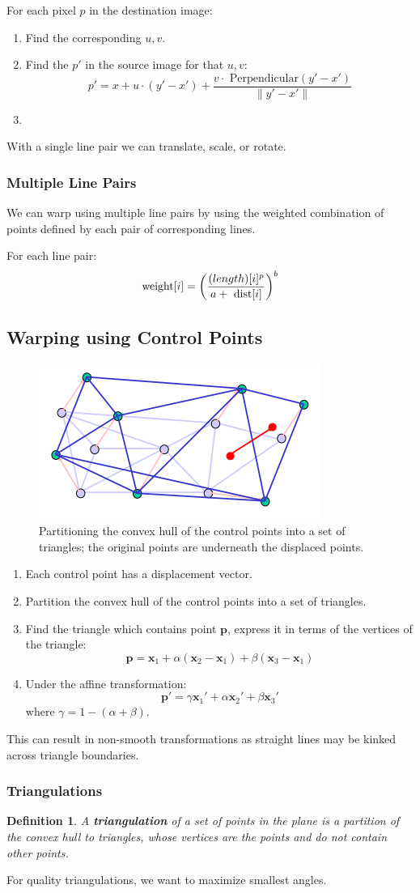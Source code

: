 \documentclass[11pt]{article}
\newtheorem{defn}{Definition}
\begin{document}
For each pixel $p$ in the destination image:
\begin{enumerate}
  \item Find the corresponding $u, v$.
  \item Find the $p'$ in the source image for that $u, v$:
    \[
      p' = x + u \cdot (y' - x') + \frac{v \cdot \text{ Perpendicular}(y'-x')}{\lVert y'-x' \rVert} 
    \]
  \item 
\end{enumerate}

With a single line pair we can translate, scale, or rotate.

\subsubsection{Multiple Line Pairs}
We can warp using multiple line pairs by using the weighted combination of points defined by each pair of corresponding lines.

For each line pair:
\[
  \text{weight}[i] = \left( \frac{\text(length)[i]^p}{a + \text{ dist}[i]} \right)^b 
\]

\subsection{Warping using Control Points}
\begin{figure}[htb!]
  \centering
  \caption{Partitioning the convex hull of the control points into a set of triangles; the original points are underneath the displaced points.}
  \includegraphics[scale=0.5]{controlpoints}
\end{figure}
\begin{enumerate}
  \item Each control point has a displacement vector.
  \item Partition the convex hull of the control points into a set of triangles.
  \item Find the triangle which contains point $\bm{p}$, express it in terms of the vertices of the triangle:
    \[
      \bm{p} = \bm{x}_1 + \alpha(\bm{x}_2 - \bm{x}_1) + \beta(\bm{x}_3 - \bm{x}_1)
    \]
  \item Under the affine transformation:
    \[
      \bm{p}' = \gamma\bm{x}_1' + \alpha\bm{x}_2' + \beta\bm{x}_3' 
    \]
    where $\gamma = 1 - (\alpha + \beta)$.
\end{enumerate}
This can result in non-smooth transformations as straight lines may be kinked across triangle boundaries.

\subsubsection{Triangulations}
\begin{defn}
  A \textbf{triangulation} of a set of points in the plane is a partition of the convex hull to triangles, whose vertices are the points and do not contain other points.
\end{defn}

For quality triangulations, we want to maximize smallest angles.
\end{document}

